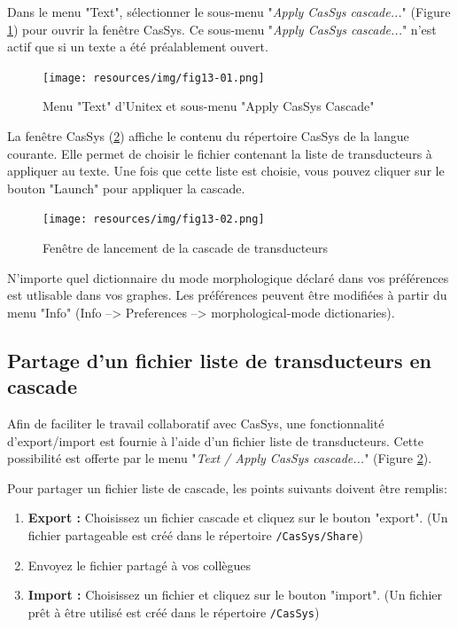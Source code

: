 Dans le menu "Text", sélectionner le sous-menu "\textit{Apply CasSys cascade...}" (Figure \ref{fig13-01}) pour ouvrir la fenêtre CasSys.
Ce sous-menu "\textit{Apply CasSys cascade...}" n'est actif que si un texte a été préalablement ouvert.

\begin{figure}[!htb]
 \centering
 \texttt{[image: resources/img/fig13-01.png]}
 \caption{Menu "Text" d'Unitex et sous-menu "Apply CasSys Cascade"}
 \label{fig13-01}
\end{figure}

La fenêtre CasSys (\ref{fig13-02}) affiche le contenu du répertoire CasSys de la langue courante. Elle
permet de choisir le fichier contenant la liste de transducteurs à appliquer au texte. Une fois que cette liste
est choisie, vous pouvez cliquer sur le bouton "Launch" pour appliquer la cascade.

\begin{figure}[!htb]
  \centering
  \texttt{[image: resources/img/fig13-02.png]}
  \caption{Fenêtre de lancement de la cascade de transducteurs}
  \label{fig13-02}
\end{figure}

N'importe quel dictionnaire du mode morphologique déclaré dans vos préférences est utlisable dans vos
graphes.
Les  préférences peuvent être modifiées à partir du menu "Info" (Info -->
Preferences --> morphological-mode dictionaries).

\subsection{Partage d'un fichier liste de transducteurs en cascade}
\label{subsec:shareCascade}

Afin de faciliter le travail collaboratif avec CasSys, une fonctionnalité d'export/import est
fournie à l'aide d'un fichier liste de transducteurs. Cette possibilité est offerte par le menu
"\textit{Text / Apply CasSys cascade...}" (Figure \ref{fig13-02}).

Pour partager un fichier liste de cascade, les points suivants doivent être remplis:
\begin{enumerate}
\item \textbf{Export :} Choisissez un fichier cascade et cliquez sur le bouton "export".
	(Un fichier partageable est créé dans le répertoire \texttt{/CasSys/Share})
\item Envoyez le fichier partagé à vos collègues
\item \textbf{Import :} Choisissez un fichier  et cliquez sur le bouton "import".
	(Un fichier prêt à être utilisé est créé dans le répertoire \texttt{/CasSys})
\end{enumerate}

